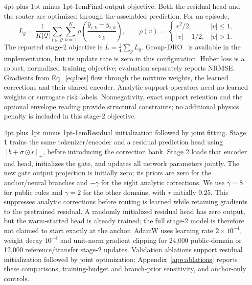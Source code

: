 \documentclass{article}
\makeatletter
\renewcommand{\paragraph}{\@startsection{paragraph}{4}{\z@}
  {4pt plus 1pt minus 1pt}{-1em}{\normalsize\bf}}
\makeatother
\begin{document}
\paragraph{Final-output objective.}
Both the residual head and the router are optimized through the assembled
prediction. For an episode,
\begin{equation}
\label{eq:loss}
 L_g=\frac{1}{K|\mathcal{Q}|}\sum_{i\in\mathcal{Q}}\sum_{k=1}^{K}
 \rho\!\left(\frac{\hat y_{i,k}-y_{i,k}}{\sigma_k}\right),\qquad
 \rho(v)=\begin{cases}v^2/2,&|v|\leq1,\\|v|-1/2,&|v|>1.\end{cases}
\end{equation}
The reported stage-2 objective is $L=\tfrac14\sum_gL_g$.
Group-DRO~\cite{dro} is available in the implementation, but its update rate is
zero in this configuration. Huber loss is a robust, normalized training
objective; evaluation separately reports NRMSE. Gradients from Eq.~\eqref{eq:loss}
flow through the mixture weights, the learned corrections and their shared
encoder. Analytic support operators need no learned weights or surrogate risk
labels. Nonnegativity, exact support retention and the optional envelope
reading provide structural constraints; no additional physics penalty is
included in this stage-2 objective.

\paragraph{Residual initialization followed by joint fitting.}
Stage 1 trains the same tokenizer/encoder and a residual prediction head using
$[b+\sigma\odot r]_+$, before introducing the correction bank. Stage 2 loads
that encoder and head, initializes the gate, and updates all network parameters
jointly. The new gate output projection is initially zero; its priors are zero
for the anchor/neural branches and $-\gamma$ for the eight analytic corrections.
We use $\gamma=8$ for public rules and $\gamma=2$ for the other domains, with
$\tau$ initially $0.25$. This suppresses analytic corrections before routing is
learned while retaining gradients to the pretrained residual. A randomly
initialized residual head has zero output, but the warm-started head is already
trained; the full stage-2 model is therefore not claimed to start exactly at
the anchor. AdamW uses learning rate $2\times10^{-4}$, weight decay $10^{-4}$
and unit-norm gradient clipping for 24{,}000 public-domain or 12{,}000
reference/transfer stage-2 updates. Validation ablations support residual
initialization followed by joint optimization; Appendix~\ref{app:ablations}
reports these comparisons, training-budget and branch-prior sensitivity,
and anchor-only controls.
\end{document}
